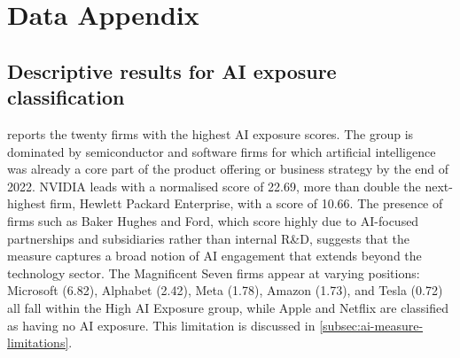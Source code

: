 \chapter{Data Appendix}
\label{app:data}

\section{Descriptive results for AI exposure classification}
\label{app:ai-descriptive-results}

 reports the twenty firms with the highest AI exposure scores. The group is dominated by semiconductor and software firms for which artificial intelligence was already a core part of the product offering or business strategy by the end of 2022. NVIDIA leads with a normalised score of 22.69, more than double the next-highest firm, Hewlett Packard Enterprise, with a score of 10.66. The presence of firms such as Baker Hughes and Ford, which score highly due to AI-focused partnerships and subsidiaries rather than internal R\&D, suggests that the measure captures a broad notion of AI engagement that extends beyond the technology sector. The Magnificent Seven firms appear at varying positions: Microsoft (6.82), Alphabet (2.42), Meta (1.78), Amazon (1.73), and Tesla (0.72) all fall within the High AI Exposure group, while Apple and Netflix are classified as having no AI exposure. This limitation is discussed in \cref{subsec:ai-measure-limitations}.

